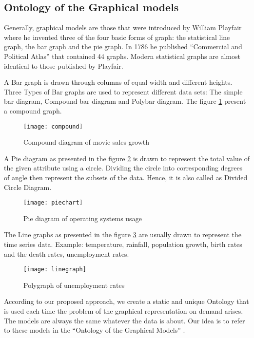 \subsection{Ontology of the Graphical models}
\label{sec_44}
Generally, graphical models are those that were introduced by William Playfair where  he invented three of the four basic forms of graph: the statistical line graph, the bar graph and the pie graph. In 1786 he published “Commercial and Political Atlas” \cite{graphmodel} that contained 44 graphs. Modern statistical graphs are almost identical to those published by Playfair.

A Bar graph \cite{graphmodel} is drawn through columns of equal width and different heights. Three Types of Bar graphs are used to represent different data sets: The simple bar diagram, Compound bar diagram and Polybar diagram. The figure \ref{fig_bar} present a compound graph.

\begin{figure}[H]
\centering
\texttt{[image: compound]}
\caption{Compound diagram of movie sales growth}
\label{fig_bar}
\end{figure}

A Pie diagram \cite{graphmodel} as presented in the figure \ref{fig_pie} is drawn to represent the total value of the given attribute using a circle. Dividing the circle into corresponding degrees of angle then represent the subsets of the data. Hence, it is also called as Divided Circle Diagram.


\begin{figure}[H]
\centering
\texttt{[image: piechart]}
\caption{Pie diagram of operating systems usage}
\label{fig_pie}
\end{figure}
\newpage

The Line graphs \cite{graphmodel} as presented in the figure \ref{fig_poly} are usually drawn to represent the time series data. Example: temperature, rainfall, population growth, birth rates and the death rates, unemployment rates.

\begin{figure}[H]
\centering
\texttt{[image: linegraph]}
\caption{Polygraph of unemployment rates}
\label{fig_poly}
\end{figure}


According to our proposed approach, we create a static and unique Ontology that is used each time the problem of the graphical representation on demand arises. The models are always the same whatever the data is about. Our idea is to refer to these models in the “Ontology of the Graphical Models” \cite{nour}.




